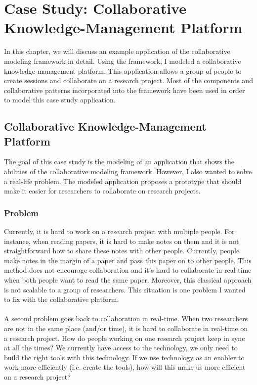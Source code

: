 \chapter{Case Study: Collaborative Knowledge-Management Platform}

In this chapter, we will discuss an example application of the collaborative modeling framework in detail. Using the framework, I modeled a collaborative knowledge-management platform. This application allows a group of people to create sessions and collaborate on a research project. Most of the components and collaborative patterns incorporated into the framework have been used in order to model this case study application. 

\section{Collaborative Knowledge-Management Platform}

The goal of this case study is the modeling of an application that shows the abilities of the collaborative modeling framework. However, I also wanted to solve a real-life problem. The modeled application proposes a prototype that should make it easier for researchers to collaborate on research projects.

\subsection{Problem}

Currently, it is hard to work on a research project with multiple people. For instance, when reading papers, it is hard to make notes on them and it is not straightforward how to share these notes with other people. Currently, people make notes in the margin of a paper and pass this paper on to other people. This method does not encourage collaboration and it's hard to collaborate in real-time when both people want to read the same paper. Moreover, this classical approach is not scalable to a group of researchers. This situation is one problem I wanted to fix with the collaborative platform. \\ \\
A second problem goes back to collaboration in real-time. When two researchers are not in the same place (and/or time), it is hard to collaborate in real-time on a research project. How do people working on one research project keep in sync at all the times? We currently have access to the technology, we only need to build the right tools with this technology. If we use technology as an enabler to work more efficiently (i.e. create the tools), how will this make us more efficient on a research project?

